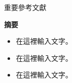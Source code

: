 \documentclass[final,hyperref={pdfpagelabels=false}]{beamer}
\begin{document}
\begin{CJK}{UTF8}{bsmi}
\begin{frame}
\begin{minipage}{0.64\textwidth}
\begin{block}{重要參考文獻}
  \nocite{*}
  
    
\end{block}
\end{minipage}
\quad
\begin{minipage}{0.34\textwidth}
\begin{alertblock}{\textbf{摘要}}
  \begin{itemize}
    \item 在這裡輸入文字。
    \item 在這裡輸入文字。
    \item 在這裡輸入文字。
  \end{itemize}
\end{alertblock}
\end{minipage}

\end{frame}
\end{CJK}
\end{document}
